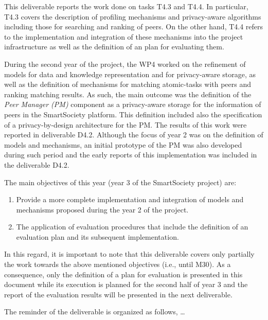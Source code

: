 This deliverable reports the work done on tasks T4.3 and T4.4. In particular, T4.3 covers the description of profiling mechanisms and privacy-aware algorithms including those for searching and ranking of peers. On the other hand, T4.4 refers to the implementation and integration of these mechanisms into the project infrastructure as well as the definition of an plan for evaluating them.

During the second year of the project, the WP4 worked on the refinement of models for data and knowledge representation and for privacy-aware storage, as well as the definition of mechanisms for matching atomic-tasks with peers and ranking matching results. 
As such, the main outcome was the definition of the \emph{Peer Manager (PM)} component as a privacy-aware storage for the information of peers in the SmartSociety platform. This definition included also the specification of a privacy-by-design architecture for the PM. The results of this work were reported in deliverable D4.2.
Although the focus of year 2 was on the definition of models and mechanisms, an initial prototype of the PM was also developed during such period and the early reports of this implementation was included in the deliverable D4.2.


The main objectives of this year (year 3 of the SmartSociety project) are:
\begin{enumerate}
\item Provide a more complete implementation and integration of models and mechanisms proposed during the year 2 of the project.
\item The application of evaluation procedures that include the definition of an evaluation plan and its subsequent implementation.
\end{enumerate}
In this regard, it is important to note that this deliverable covers only partially the work towards the above mentioned objectives (i.e., until M30). As a consequence, only the definition of a plan for evaluation is presented in this document while its execution is planned for the second half of year 3 and the report of the evaluation results will be presented in the next deliverable.

The reminder of the deliverable is organized as follows, \ldots 
